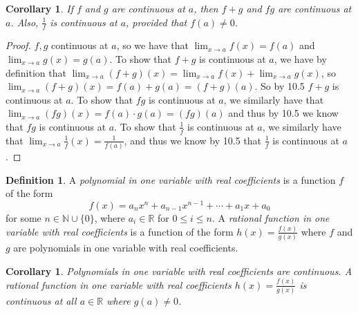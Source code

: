 \documentclass[12pt]{article}
\newcommand{\bbN}{\mathbb{N}}
\newcommand{\bbR}{\mathbb{R}}
\renewcommand{\_}[1]{\underline{ #1 }}
\newtheorem{corollary}[theorem]{Corollary}
\theoremstyle{definition}
\newtheorem{definition}[theorem]{Definition}
\numberwithin{equation}{subsection}
\begin{document}
\begin{corollary}  If $f$ and $g$ are continuous at $a$, then $f + g$ and $fg$  are continuous at $a$. Also, $\frac{1}{f}$ is continuous at $a$,   provided that $f(a) \neq 0$.
\end{corollary}

\begin{proof}
$f,g$ continuous at $a$, so we have that $\lim_{x \to a}f(x) = f(a)$ and $\lim_{x \to a}g(x) = g(a)$. \newline
To show that $f + g$ is continuous at $a$, we have by definition that $\lim_{x \to a}(f + g)(x) = \lim_{x \to a}f(x) + \lim_{x \to a}g(x)$, so $\lim_{x \to a}(f + g)(x) = f(a) + g(a) = (f + g)(a)$. So by 10.5 $f + g$ is continuous at $a$. \newline
To show that $fg$ is continuous at $a$, we similarly have that $\lim_{x \to a}(fg)(x) = f(a) \cdot g(a) = (fg)(a)$ and thus by 10.5 we know that $fg$ is continuous at $a$. \newline
To show that $\frac{1}{f}$ is continuous at $a$, we similarly have that $\lim_{x \to a}\frac{1}{f}(x) = \frac{1}{f(a)}$, and thus we know by 10.5 that $\frac{1}{f}$ is continuous at $a$.
\end{proof}

\begin{definition}A \emph{polynomial in one variable with real coefficients} is a function $f$ of the form 
$$f(x)=a_n x^n+a_{n-1}x^{n-1}+\cdots+a_1 x+a_0$$ 
for some $n\in\bbN\cup\{0\}$, where $a_i\in\bbR$ for $0\leq i\leq n$. A \emph{rational function in one variable with real coefficients} is a function of the form $h(x)=\frac{f(x)}{g(x)}$ where $f$ and $g$ are polynomials
in one variable with real coefficients.\end{definition}

\begin{corollary}Polynomials in one variable with real coefficients are continuous. A rational function in one variable with real coefficients $h(x)=\frac{f(x)}{g(x)}$ is continuous at all $a\in\bbR$ where $g(a)\neq 0$. \end{corollary} 
\end{document}
